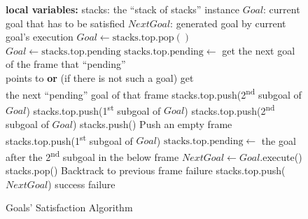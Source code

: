 \documentclass{ws-ijait}
\begin{document}
\begin{figure}
  \centering
  \begin{algorithmic}
      \State \textbf{local variables:}
      \State \quad stacks: the ``stack of stacks'' instance
      \State \quad $\mathit{Goal}$: current goal that has to
                   be satisfied
      \State \quad $\mathit{NextGoal}$: generated goal by
                   current goal's execution
      \State
          \State $\mathit{Goal} \gets
                  \mathrm{stacks.top.pop()}$
        \Else
          \State $\mathit{Goal} \gets
                  \mathrm{stacks.top.pending}$
          \State $\mathrm{stacks.top.pending} \gets$
                 get the next goal of the frame that
                 ``pending'' \\ \hspace*{14em} points to
                 \textbf{or} (if there is not such a goal)
                 get \\ \hspace*{14em} the next ``pending''
                 goal of that frame
        \EndIf
          \State stacks.top.push(2\textsuperscript{nd}
                 subgoal of $\mathit{Goal}$)
          \State stacks.top.push(1\textsuperscript{st}
                 subgoal of $\mathit{Goal}$)
          \State stacks.top.push(2\textsuperscript{nd}
                 subgoal of $\mathit{Goal}$)
          \State stacks.push() \Comment Push an empty frame
          \State stacks.top.push(1\textsuperscript{st}
                 subgoal of $\mathit{Goal}$)
          \State $\mathrm{stacks.top.pending} \gets$
                 the goal after the 2\textsuperscript{nd}
                 subgoal in the below frame
        \Else
          \State $\mathit{NextGoal} \gets
                  \mathit{Goal}$.execute()
            \State stacks.pop()
            \Comment Backtrack to previous frame
              \State \Return failure
            \EndIf
            \State stacks.top.push($\mathit{NextGoal}$)
            \State \Return success
          \EndIf
        \EndIf
      \EndWhile
      \State \Return failure
    \EndFunction
  \end{algorithmic}
  \caption{Goals' Satisfaction Algorithm\label{solve}}
\end{figure}
\end{document}

